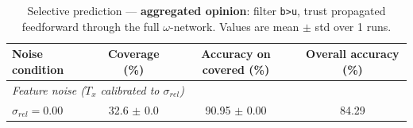 \begin{table}[ht]
\centering
\caption{Selective prediction — \textbf{aggregated opinion}: filter \texttt{b>u}, trust propagated feedforward through the full $\omega$-network. Values are mean $\pm$ std over 1 runs.}
\label{tab:thresh-aggr-0-5}
\begin{tabular}{lccc}
\toprule
Noise condition & Coverage (\%) & Accuracy on covered (\%) & Overall accuracy (\%) \\
\midrule
\multicolumn{4}{l}{\textit{Feature noise ($T_x$ calibrated to $\sigma_{rel}$)}} \\
$\sigma_{rel}=0.00$ & 32.6 $\pm$ 0.0 & 90.95 $\pm$ 0.00 & 84.29 \\
\bottomrule
\end{tabular}
\end{table}